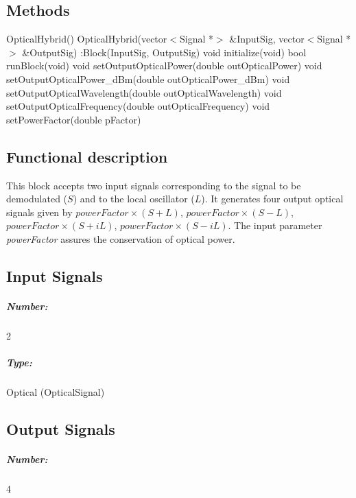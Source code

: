 
\subsection*{Methods}
 
OpticalHybrid() {}
\bigbreak
OpticalHybrid(vector$<$Signal *$>$ \&InputSig, vector$<$Signal *$>$ \&OutputSig) :Block(InputSig, OutputSig) {}
\bigbreak
void initialize(void)
\bigbreak
bool runBlock(void)
\bigbreak
void setOutputOpticalPower(double outOpticalPower)
\bigbreak
void setOutputOpticalPower\_dBm(double outOpticalPower\_dBm)
\bigbreak
void setOutputOpticalWavelength(double outOpticalWavelength)
\bigbreak
void setOutputOpticalFrequency(double outOpticalFrequency) 
\bigbreak
void setPowerFactor(double pFactor)

\subsection*{Functional description}

This block accepts two  input signals corresponding to the signal to be demodulated ($S$) and to the local oscillator ($L$). It generates four output optical signals given by $\textit{powerFactor}\times(S+L)$, $\textit{powerFactor}\times(S-L)$,$\textit{powerFactor}\times(S+iL)$, $\textit{powerFactor}\times(S-iL)$. The input parameter \textit{powerFactor} assures the conservation of optical power.

\subsection*{Input Signals}

\subparagraph*{Number:} 2

\subparagraph*{Type:} Optical (OpticalSignal)

\subsection*{Output Signals}

\subparagraph*{Number:} 4

